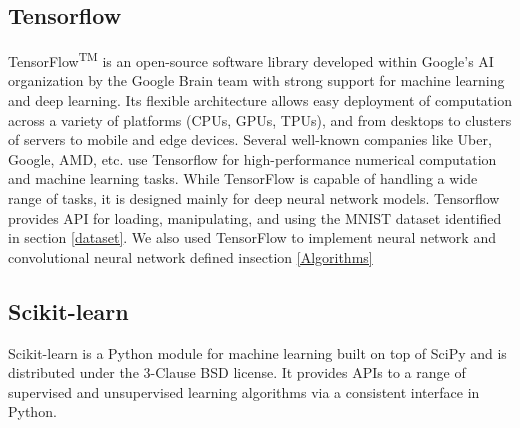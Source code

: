 \subsection{Tensorflow}
TensorFlow\textsuperscript{TM} is an open-source software library developed within Google’s AI organization by the Google Brain team with strong support for machine learning and deep learning. Its flexible architecture allows easy deployment of computation across a variety of platforms (CPUs, GPUs, TPUs), and from desktops to clusters of servers to mobile and edge devices. Several well-known companies like Uber, Google, AMD, etc. use Tensorflow for high-performance numerical computation and machine learning tasks. While TensorFlow is capable of handling a wide range of tasks, it is designed mainly for deep neural network models. Tensorflow provides API for loading, manipulating, and using the MNIST dataset identified in section \ref{dataset}. We also used TensorFlow to implement neural network and convolutional neural network defined insection \ref{Algorithms}


\subsection{Scikit-learn}
Scikit-learn is a Python module for machine learning built on top of SciPy and is distributed under the 3-Clause BSD license.
It provides APIs to a range of supervised and unsupervised learning algorithms via a consistent interface in Python.


